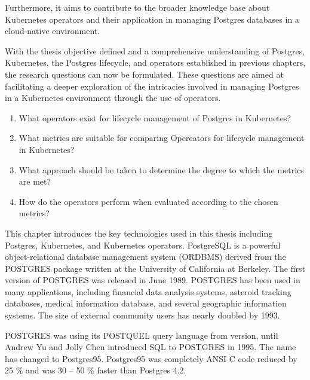 Furthermore, it aims to contribute to the broader knowledge base about Kubernetes operators and their application in managing Postgres databases in a cloud-native environment.


\label{chap:resourceQuestions}
With the thesis objective defined and a comprehensive understanding of Postgres, Kubernetes, the Postgres lifecycle, and operators established in previous chapters, the research questions can now be formulated.
These questions are aimed at facilitating a deeper exploration of the intricacies involved in managing Postgres in a Kubernetes environment through the use of operators.

\begin{enumerate}
    \item What operators exist for lifecycle management of Postgres in Kubernetes?
    \item What metrics are suitable for comparing Opereators for lifecycle management in Kubernetes?
    \item What approach should be taken to determine the degree to which the metrics are met?
    \item How do the operators perform when evaluated according to the chosen metrics?
\end{enumerate}



\sloppy
{}
This chapter introduces the key technologies used in this thesis including Postgres, Kubernetes, and Kubernetes operators.
PostgreSQL is a powerful object-relational database management system (ORDBMS) derived from the POSTGRES package written at the University of California at Berkeley. \cite{docuPgwhatIsPg} \cite{pg14introduction} The first version of POSTGRES was released in June 1989. POSTGRES has been used in many applications, including financial data analysis systems, asteroid tracking databases, medical information database, and several geographic information systems. The size of external community users has nearly doubled by 1993. \cite{docuPgBriefHistory}

POSTGRES was using its POSTQUEL query language from version, until Andrew Yu and Jolly Chen introduced SQL to POSTGRES in 1995. The name has changed to Postgres95. Postgres95 was completely ANSI C code reduced by 25 \% and was 30 – 50 \% faster than Postgres 4.2.  \cite{docuPgBriefHistory}

